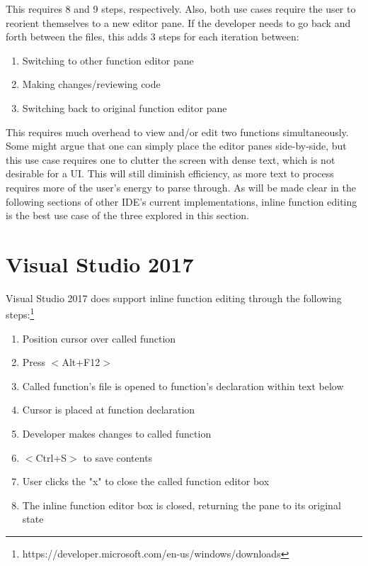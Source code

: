 \documentclass[]{report}
\begin{document}
		This requires 8 and 9 steps, respectively.  Also, both use cases require the user to reorient themselves to a new editor pane.  If the developer needs to go back and forth between the files, this adds 3 steps for each iteration between:
		
			\begin{enumerate}
				\item
				Switching to other function editor pane
				
				\item
				Making changes/reviewing code
				
				\item 
				Switching back to original function editor pane
			\end{enumerate}

		This requires much overhead to view and/or edit two functions simultaneously.  Some might argue that one can simply place the editor panes side-by-side, but this use case requires one to clutter the screen with dense text, which is not desirable for a UI.  This will still diminish efficiency, as more text to process requires more of the user's energy to parse through.  As will be made clear in the following sections of other IDE's current implementations, inline function editing is the best use case of the three explored in this section.

	\section{Visual Studio 2017}

		Visual Studio 2017 does support inline function editing through the following steps:\footnote{https://developer.microsoft.com/en-us/windows/downloads}

			\begin{enumerate}
				\item
				Position cursor over called function
				
				\item 
				Press $<$Alt+F12$>$
				
				\item
				Called function's file is opened to function's declaration within text below
				
				\item
				Cursor is placed at function declaration
				
				\item 
				Developer makes changes to called function
				
				\item
				$<$Ctrl+S$>$ to save contents
		
				\item 
				User clicks the "x" to close the called function editor box
			
				\item 
				The inline function editor box is closed, returning the pane to its original state
			\end{enumerate}
		
\end{document}
